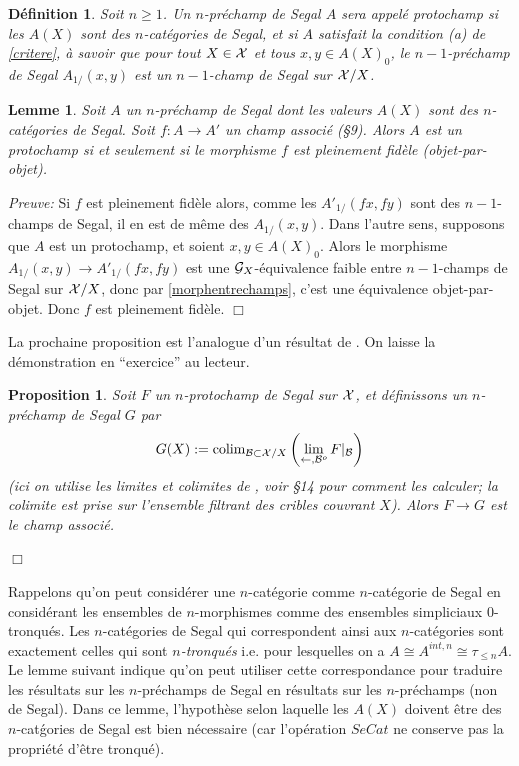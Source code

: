 \documentclass[12pt]{article}
\newcommand{\eop}{\hfill $\Box$\vspace{.1in}}
\newtheorem{proposition}[lemma]{Proposition}
\newtheorem{lemme}[lemma]{Lemme}
\newtheorem{definition}[lemma]{D\'efinition}
\newcommand{\Gg}{{\cal G}}
\newcommand{\Bb}{{\cal B}}
\newcommand{\Xx}{{\cal X}}
\begin{document}
\begin{definition}
Soit $n\geq 1$.
Un $n$-pr\'echamp de Segal $A$ sera appel\'e {\em protochamp} si les $A(X)$ sont
des $n$-cat\'egories de Segal, et si $A$ satisfait la condition (a) de
\ref{critere}, \`a savoir que pour tout $X\in \Xx$ et tous $x,y\in A(X)_0$, le
$n-1$-pr\'echamp de Segal $A_{1/}(x,y)$ est un $n-1$-champ de Segal sur
$\Xx /X$.
\end{definition}


\begin{lemme}
Soit $A$ un $n$-pr\'echamp de Segal dont les valeurs $A(X)$ sont des
$n$-ca\-t\'e\-go\-ries de Segal. Soit $f:A\rightarrow A'$ un champ
associ\'e (\S 9). Alors $A$ est un protochamp si et seulement si le
morphisme $f$
est pleinement fid\`ele (objet-par-objet).
\end{lemme}
{\em Preuve:}
Si $f$ est pleinement fid\`ele alors, comme les $A'_{1/}(fx,fy)$  sont des
$n-1$-champs de Segal, il en est de m\^eme des $A_{1/}(x,y)$. Dans l'autre sens,
supposons que $A$ est un protochamp, et soient $x,y\in A(X)_0$.
Alors le morphisme $A_{1/}(x,y)\rightarrow A'_{1/}(fx,fy)$ est une
$\Gg_X$-\'equivalence faible entre $n-1$-champs de Segal sur $\Xx /X$,
donc par \ref{morphentrechamps}, c'est une \'equivalence objet-par-objet.
Donc $f$ est pleinement fid\`ele.
\eop

La prochaine proposition est l'analogue d'un r\'esultat de \cite{flexible}. On
laisse la d\'e\-mon\-stra\-tion en ``exercice'' au lecteur.

\begin{proposition}
\label{exo}
Soit $F$ un $n$-protochamp de Segal sur $\Xx$, et d\'efinissons un
$n$-pr\'e\-champ de Segal $G$ par
$$
G(X):= {\rm colim} _{\Bb \subset \Xx /X}\left( \lim _{\leftarrow , \Bb ^o}
F|_{\Bb} \right)
$$
(ici on utilise les limites et colimites de \cite{limits}, voir \S 14 pour
comment les calculer; la colimite est prise sur l'ensemble filtrant des cribles
couvrant $X$). Alors $F\rightarrow G$ est le champ associ\'e.
\end{proposition}
\eop

Rappelons qu'on peut consid\'erer une $n$-cat\'egorie comme $n$-cat\'egorie de
Segal en
consid\'erant les ensembles de $n$-morphismes
comme des ensembles simpliciaux $0$-tronqu\'es. Les $n$-cat\'egories
de Segal qui correspondent ainsi aux $n$-cat\'egories sont exactement celles
qui sont {\em $n$-tronqu\'es} i.e. pour lesquelles
on a $A\cong A^{int, n}\cong \tau
_{\leq n}A$. Le lemme suivant indique qu'on peut utiliser cette correspondance
pour traduire les r\'esultats sur les $n$-pr\'echamps de Segal en
r\'esultats sur les $n$-pr\'echamps (non de Segal).
Dans ce lemme, l'hypoth\`ese selon laquelle les $A(X)$
doivent \^etre des $n$-cat\'gories de Segal est bien n\'ecessaire
(car l'op\'eration $SeCat$ ne conserve pas la propri\'et\'e d'\^etre
tronqu\'e).
\end{document}
